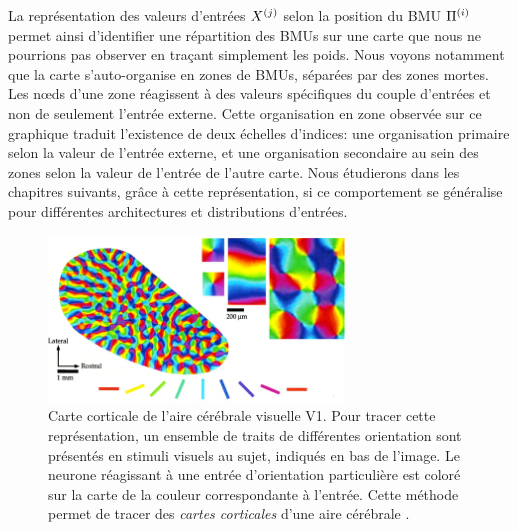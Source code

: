 \documentclass[../main]{subfiles}
\begin{document}
La représentation des valeurs d'entrées $X^{({j})}$ selon la position du BMU $\Pi^{({i})}$ permet ainsi d'identifier une répartition des BMUs sur une carte que nous ne pourrions pas observer en traçant simplement les poids.
Nous voyons notamment que la carte s'auto-organise en zones de BMUs, séparées par des zones mortes.
Les n\oe{}ds d'une zone réagissent à des valeurs spécifiques du couple d'entrées et non de seulement l'entrée externe.
Cette organisation en zone observée sur ce graphique traduit l'existence de deux échelles d'indices: une organisation primaire selon la valeur de l'entrée externe, et une organisation secondaire au sein des zones selon la valeur de l'entrée de l'autre carte.
Nous étudierons dans les chapitres suivants, grâce à cette représentation, si ce comportement se généralise pour différentes architectures et distributions d'entrées.



\begin{figure}
    \centering
    \includegraphics[width=0.7\textwidth]{v1.jpg}
    \caption{Carte corticale de l'aire cérébrale visuelle V1. Pour tracer cette représentation, un ensemble de traits de différentes orientation sont présentés en stimuli visuels au sujet, indiqués en bas de l'image. Le neurone réagissant à une entrée d'orientation particulière est coloré sur la carte de la couleur correspondante à l'entrée. Cette méthode permet de tracer des \emph{cartes corticales} d'une aire cérébrale \cite{Bosking1997OrientationSA}. \label{fig:v1_repr}}
\end{figure}
\end{document}
